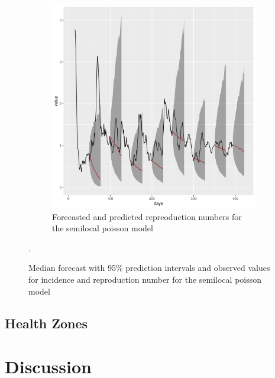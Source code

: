 \documentclass[12pt]{article}
\begin{document}
\begin{figure}[h]
\begin{subfigure}{\textwidth}
  \centering
  \includegraphics[width=0.9\linewidth]{../output/national_Rs.png}  
  \caption{Forecasted and predicted repreoduction numbers for the semilocal poisson model}
  \label{fig:sub-second}
\end{subfigure}
  \caption{Median forecast with 95\% prediction intervals and observed values for incidence and reproduction number for the semilocal poisson model}.

  \label{fig:nat_pred}
\end{figure}







\subsection{Health Zones}

 




\section{Discussion}
\end{document}
